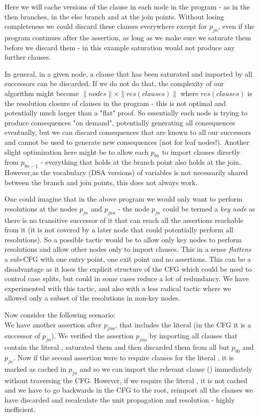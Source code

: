Here we will cache versions of the clause  in each node in the program - as  in the then branches,  in the else branch and   at the join points.
Without losing completeness we could discard these clauses everywhere except for $p_{jn}$, even if the program continues after the assertion, as long as we make sure we saturate them before we discard them - in this example saturation would not produce any further clauses.

In general, in a given node, a clause that has been saturated and imported by all successors can be discarded.
If we do not do that, the complexity of our algorithm might become $\|nodes\| \times \|res(clauses)\|$ where $res(clauses)$ is the resolution closure of clauses in the program - this is not optimal and potentially much larger than a "flat" proof.
So essentially each node is trying to produce consequences "on demand", potentially generating all consequences eventually, but we can discard consequences that are known to all our successors and cannot be used to generate new consequences (not for leaf nodes!).
Another slight optimization here might be to allow each $p_{bn}$ to import clauses directly from $p_{bn-1}$ - everything that holds at the branch point also holds at the join. However,as the vocabulary (DSA versions) of variables is not necessarily shared between the branch and join points, this does not always work.

One could imagine that in the above program we would only want to perform resolutions at the nodes $p_{jn}$ and $p_{jna}$ - the node $p_{jn}$ could be termed a \emph{key node} as there is no transitive successor of it that can reach all the assertions reachable from it (it is not covered by a later node that could potentially perform all resolutions).
So a possible tactic would be to allow only key nodes to perform resolutions and allow other nodes only to import clauses. This in a sense \emph{flattens} a sub-CFG with one entry point, one exit point and no assertions.
This can be a disadvantage as it loses the explicit structure of the CFG which could be used to control case splits, but could in some cases reduce a lot of redundancy.
We have experimented with this tactic, and also with a less radical tactic where we allowed only a subset of the resolutions in non-key nodes.

Now consider the following scenario:\\
We have another assertion after $p_{jna}$, that includes the literal  (in the CFG it is a successor of $p_{jn}$).
We verified the assertion $p_{jna}$ by importing all clauses that contain the literal , saturated them and then discarded them from all but $p_{b0}$ and $p_{jn}$.
Now if the second assertion were to require clauses for the literal , it is marked as cached in $p_{jn}$ and so we can import the relevant clause ()  immediately without traversing the CFG.
However, if we require the literal , it is not cached and we have to go backwards in the CFG to the root, reimport all the clauses we have discarded and recalculate the unit propagation and resolution - highly inefficient.

